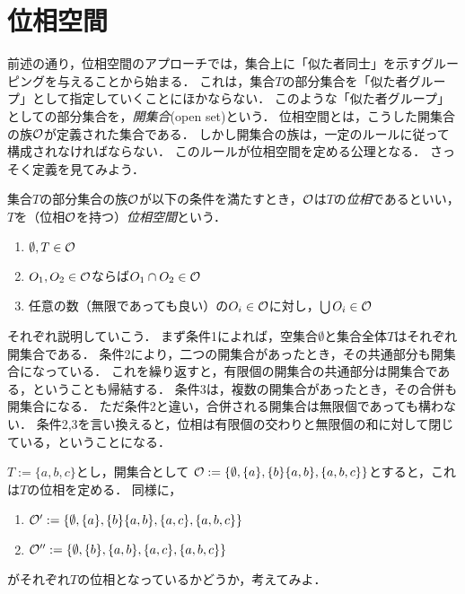 \documentclass[11pt,a4paper]{jsarticle}
\begin{document}
\section{位相空間}

前述の通り，位相空間のアプローチでは，集合上に「似た者同士」を示すグルーピングを与えることから始まる．
これは，集合$T$の部分集合を「似た者グループ」として指定していくことにほかならない．
このような「似た者グループ」としての部分集合を，\emph{開集合}(open set)という．
位相空間とは，こうした開集合の族$\mathcal{O}$が定義された集合である．
しかし開集合の族は，一定のルールに従って構成されなければならない．
このルールが位相空間を定める公理となる．
さっそく定義を見てみよう．

\begin{dfn}[位相空間]
集合$T$の部分集合の族$\mathcal{O}$が以下の条件を満たすとき，$\mathcal{O}$は$T$の\emph{位相}であるといい，$T$を（位相$\mathcal{O}$を持つ）\emph{位相空間}という．
\begin{enumerate}
 \item $\emptyset, T \in \mathcal{O}$
 \item $O_1, O_2 \in \mathcal{O}$ならば$O_1 \cap O_2 \in \mathcal{O}$
 \item 任意の数（無限であっても良い）の$O_i \in \mathcal{O}$に対し，$\bigcup O_i \in \mathcal{O}$
\end{enumerate}
\end{dfn}

それぞれ説明していこう．
まず条件1によれば，空集合$\emptyset$と集合全体$T$はそれぞれ開集合である．
条件2により，二つの開集合があったとき，その共通部分も開集合になっている．
これを繰り返すと，有限個の開集合の共通部分は開集合である，ということも帰結する．
条件3は，複数の開集合があったとき，その合併も開集合になる．
ただ条件2と違い，合併される開集合は無限個であっても構わない．
条件2,3を言い換えると，位相は有限個の交わりと無限個の和に対して閉じている，ということになる．

\begin{example}
\label{topologyex}
$T:=\{a, b, c\}$とし，開集合として
$\mathcal{O} := \{ \emptyset, \{a \}, \{b\} \{a,b\}, \{a,b,c\} \}$とすると，これは$T$の位相を定める．
同様に，
\begin{enumerate}
\item $\mathcal{O}' := \{ \emptyset, \{a \}, \{b\} \{a,b\}, \{a, c\}, \{a,b,c\} \}$
\item $\mathcal{O}'' := \{ \emptyset, \{b\}, \{a,b\}, \{a, c\}, \{a,b,c\} \}$
\end{enumerate}
がそれぞれ$T$の位相となっているかどうか，考えてみよ．
\end{example}
\end{document}
